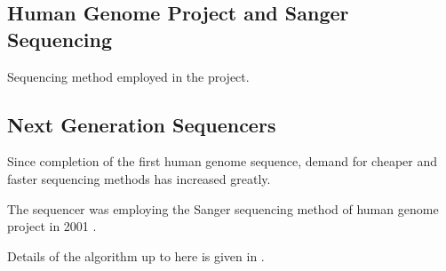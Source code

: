 \subsection{Human Genome Project and Sanger Sequencing} \label{sec:genProject}
	
Sequencing method employed in the project.

\subsection{Next Generation Sequencers}

Since completion of the first human genome sequence, demand for cheaper and faster sequencing methods has increased greatly.

The sequencer was employing the Sanger sequencing method of human genome project in 2001 \cite{petitti2005blood,hong2011state,vapnik2013nature,mitsuoka1990role,rennie2001improving,Yang2012,Yang2013}.

Details of the algorithm up to here is given in .



